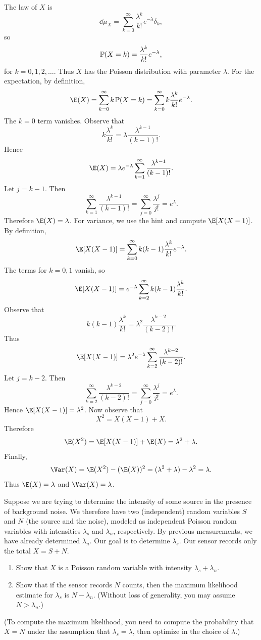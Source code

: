 \begin{solution}
  The law of $X$ is
  \[%
    \dd{\mu}_X = \sum_{k=0}^{\infty} \frac{\lambda^k}{k!}e^{-\lambda}\delta_k
  ,\]%
  so
  \[%
    \P(X = k) = \frac{\lambda^k}{k!}e^{-\lambda}
  ,\]%
  for $k = 0, 1, 2, \dots$. Thus $X$ has the Poisson distribution with parameter $\lambda$. For the expectation, by definition,
  \[%
    \E(X) = \sum_{k=0}^{\infty} k\,\P(X=k) = \sum_{k=0}^{\infty} k \frac{\lambda^k}{k!} e^{-\lambda}
  .\]%
  The $k = 0$ term vanishes. Observe that
  \[%
    k\frac{\lambda^k}{k!} = \lambda \frac{\lambda^{k-1}}{(k-1)!}
  .\]%
  Hence
  \[%
    \E(X) = \lambda e^{-\lambda}\sum_{k=1}^{\infty} \frac{\lambda^{k-1}}{(k-1)!}
  .\]%
  Let $j = k - 1$. Then
  \[%
    \sum_{k=1}^{\infty} \frac{\lambda^{k-1}}{(k-1)!} = \sum_{j=0}^{\infty} \frac{\lambda^j}{j!} = e^{\lambda}
  .\]%
  Therefore $\E(X) = \lambda$. For variance, we use the hint and compute $\E[X(X - 1)]$. By definition,
  \[%
    \E[X(X-1)] = \sum_{k=0}^{\infty} k(k-1)\frac{\lambda^k}{k!}e^{-\lambda}
  .\]%
  The terms for $k = 0, 1$ vanish, so
  \[%
    \E[X(X - 1)] = e^{-\lambda}\sum_{k=2}^{\infty} k(k - 1)\frac{\lambda^k}{k!}
  .\]%
  Observe that
  \[%
    k(k - 1)\frac{\lambda^k}{k!} = \lambda^2 \frac{\lambda^{k-2}}{(k-2)!}
  .\]%
  Thus
  \[%
    \E[X(X - 1)] = \lambda^2 e^{-\lambda}\sum_{k=2}^{\infty} \frac{\lambda^{k-2}}{(k-2)!}
  .\]%
  Let $j = k - 2$. Then
  \[%
    \sum_{k=2}^{\infty} \frac{\lambda^{k-2}}{(k - 2)!} = \sum_{j=0}^{\infty} \frac{\lambda^j}{j!} = e^{\lambda}
  .\]%
  Hence $\E[X(X - 1)] = \lambda^2$. Now observe that
  \[%
    X^2 = X(X - 1) + X
  .\]%
  Therefore
  \[%
    \E(X^2) = \E[X(X - 1)] + \E(X) = \lambda^2 + \lambda
  .\]%
  Finally,
  \[%
    \Var(X) = \E(X^2) - (\E(X))^2 = (\lambda^2 + \lambda) - \lambda^2 = \lambda
  .\]%
  Thus $\E(X) = \lambda$ and $\Var(X) = \lambda$.
\end{solution}

\begin{problem}[3]
  Suppose we are trying to determine the intensity of some source in the presence of background noise.  We therefore have two (independent) random variables $S$ and $N$ (the source and the noise), modeled as independent Poisson random variables with intensities $\lambda_s$ and $\lambda_n$, respectively.  By previous measurements, we have already determined $\lambda_n$.  Our goal is to determine $\lambda_s$.  Our sensor records only the total $X=S+N$. 
  \begin{enumerate}
    \item Show that $X$ is a Poisson random variable with intensity $\lambda_s+\lambda_n$. 
    \item Show that if the sensor records $N$ counts, then the maximum likelihood estimate for $\lambda_s$ is $N-\lambda_n$.  (Without loss of generality, you may assume $N>\lambda_n$.)  
  \end{enumerate}
  (To compute the maximum likelihood, you need to compute the probability that $X=N$ under the assumption that $\lambda_s=\lambda$, then optimize in the choice of $\lambda$.) 
\end{problem}

